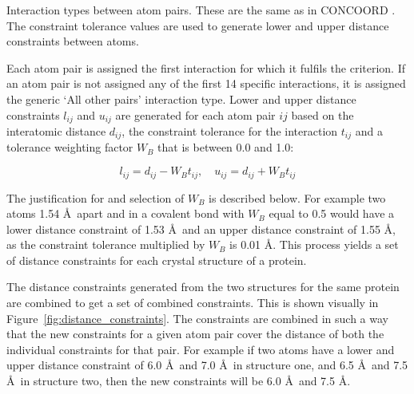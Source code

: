 \begin{table}
\caption{Interaction types between atom pairs.
These are the same as in CONCOORD \cite{DeGroot1997}.
The constraint tolerance values are used to generate lower and upper distance constraints between atoms.}

\label{tab:interaction_types}
\end{table}


Each atom pair is assigned the first interaction for which it fulfils the criterion.
If an atom pair is not assigned any of the first 14 specific interactions, it is assigned the generic `All other pairs' interaction type.
Lower and upper distance constraints $l_{ij}$ and $u_{ij}$ are generated for each atom pair $ij$ based on the interatomic distance $d_{ij}$, the constraint tolerance for the interaction $t_{ij}$ and a tolerance weighting factor $W_{B}$ that is between 0.0 and 1.0:

$$
l_{ij} = d_{ij} - W_{B} t_{ij}, \quad u_{ij} = d_{ij} + W_{B} t_{ij}
$$

The justification for and selection of $W_{B}$ is described below.
For example two atoms 1.54 \AA\ apart and in a covalent bond with $W_{B}$ equal to 0.5 would have a lower distance constraint of 1.53 \AA\ and an upper distance constraint of 1.55 \AA, as the constraint tolerance multiplied by $W_{B}$ is 0.01 \AA.
This process yields a set of distance constraints for each crystal structure of a protein.

The distance constraints generated from the two structures for the same protein are combined to get a set of combined constraints.
This is shown visually in Figure~\ref{fig:distance_constraints}.
The constraints are combined in such a way that the new constraints for a given atom pair cover the distance of both the individual constraints for that pair.
For example if two atoms have a lower and upper distance constraint of 6.0 \AA\ and 7.0 \AA\ in structure one, and 6.5 \AA\ and 7.5 \AA\ in structure two, then the new constraints will be 6.0 \AA\ and 7.5 \AA.



